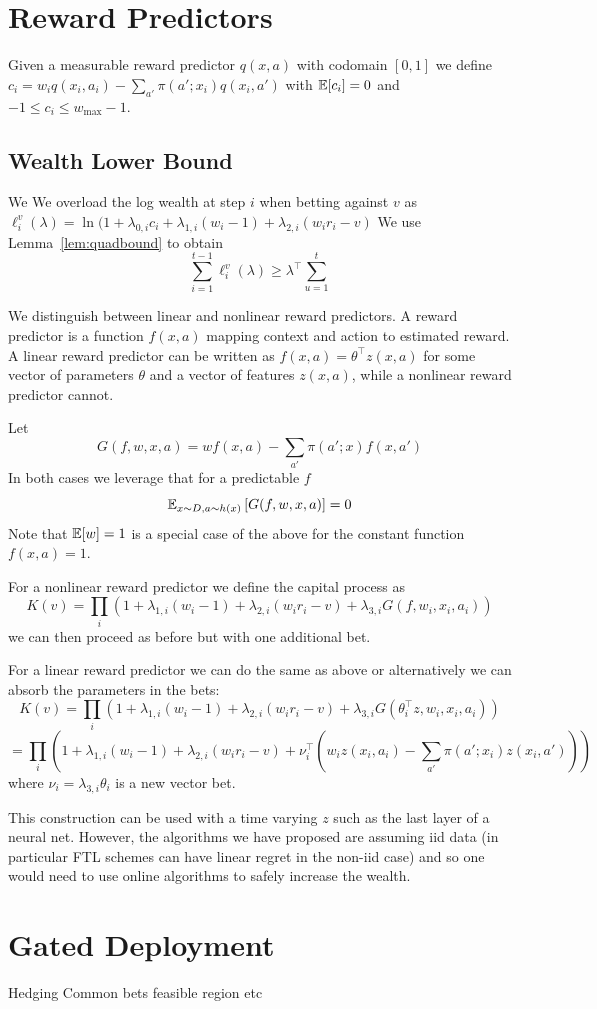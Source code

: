 \section{Reward Predictors}
\label{app:reward-predictors}
Given a measurable reward predictor $q(x,a)$ 
with codomain $[0,1]$ we define
$
c_i = w_i q(x_i,a_i) - \sum_{a'} \pi(a';x_i)q(x_i,a')
$ 
with $\mathbb{E}[c_i]=0$ and $-1\leq c_i \leq w_{\max}-1$.

\subsection{Wealth Lower Bound}
We 
We overload the log wealth at step $i$ when betting against $v$ as 
$\ell_i^v(\lambda) = \ln(1+\lambda_{0,i} c_i + \lambda_{1,i}(w_i-1) + \lambda_{2,i}(w_i r_i -v)$
We use Lemma~\ref{lem:quadbound} to obtain
\[
\sum_{i=1}^{t-1} \ell_i^v(\lambda) \geq \lambda^\top \sum_{u=1}^{t} 
\]

We distinguish between linear and nonlinear reward predictors.
A reward predictor is a function $f(x,a)$ mapping
context and action to estimated reward. A linear 
reward predictor can be written
as $f(x,a)=\theta^\top z(x,a)$ for some vector of parameters
$\theta$ and a vector of features $z(x,a)$, while a 
nonlinear reward predictor cannot. 

Let
\[
G(f,w,x,a)= w f(x,a) - \sum_{a'} \pi(a';x) f(x,a')
\]
In both cases we leverage that for a predictable $f$
\[
\mathbb{E}_{x\sim D,a\sim h(x)}\left[G(f,w,x,a)\right] = 0
\]
Note that $\mathbb{E}[w]=1$ is a special case of the above 
for the constant function $f(x,a)=1$. 

For a nonlinear reward predictor we define the capital 
process as
\[
K(v)=\prod_{i} \left(1+\lambda_{1,i} (w_i -1) 
+ \lambda_{2,i} (w_i r_i -v) 
+ \lambda_{3,i} G(f,w_i,x_i,a_i)\right)
\]
we can then proceed as before but with one additional
bet.

For a linear reward predictor we can do the same
as above or alternatively we can absorb the 
parameters in the bets:
\[
K(v)=\prod_{i} \left(1+\lambda_{1,i} (w_i -1) 
+ \lambda_{2,i} (w_i r_i -v) 
+ \lambda_{3,i} G(\theta_i^\top z, w_i,x_i,a_i)\right)
\]
\[
=\prod_{i} \left(1+\lambda_{1,i} (w_i -1) 
+ \lambda_{2,i} (w_i r_i -v) 
+ \nu_i^\top \left(w_i z(x_i,a_i) - \sum_{a'} \pi(a';x_i) z(x_i,a') \right)\right)
\]
where $\nu_i = \lambda_{3,i}\theta_i$ is a new vector bet.

This construction can be used with a time varying $z$
such as the last layer of a neural net. However, the algorithms
we have proposed are assuming iid data (in particular FTL schemes
can have linear regret in the non-iid case) and so one would need to use online algorithms to safely increase the wealth.


\section{Gated Deployment}
\label{app:gd}
Hedging
Common bets feasible region etc
